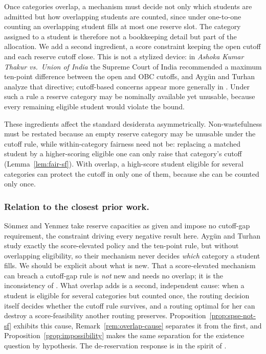 \documentclass[a4paper,twoside]{article}
\theoremstyle{definition}
\begin{document}
Once categories overlap, a mechanism must decide not only which students are admitted but how overlapping students are counted, since under one-to-one counting an overlapping student fills at most one reserve slot. The category assigned to a student is therefore not a bookkeeping detail but part of the allocation. We add a second ingredient, a score constraint keeping the open cutoff and each reserve cutoff close. This is not a stylized device: in \emph{Ashoka Kumar Thakur vs.\ Union of India} the Supreme Court of India recommended a maximum ten-point difference between the open and OBC cutoffs, and Ayg\"un and Turhan \cite{AyTu23b} analyze that directive; cutoff-based concerns appear more generally in \cite{AyTu23a,ABB24a}. Under such a rule a reserve category may be nominally available yet unusable, because every remaining eligible student would violate the bound.

These ingredients affect the standard desiderata \cite{EHYY14a,KHIY17a,GKK+17a} asymmetrically. Non-wastefulness must be restated because an empty reserve category may be unusable under the cutoff rule, while within-category fairness need not be: replacing a matched student by a higher-scoring eligible one can only raise that category's cutoff (Lemma~\ref{lem:fair-sf}). With overlap, a high-score student eligible for several categories can protect the cutoff in only one of them, because she can be counted only once.

\subsubsection{Relation to the closest prior work.}
S\"onmez and Yenmez \cite{SoYe20a,SoYe22a} take reserve capacities as given and impose no cutoff-gap requirement, the constraint driving every negative result here. Ayg\"un and Turhan \cite{AyTu23b} study exactly the score-elevated policy and the ten-point rule, but without overlapping eligibility, so their mechanism never decides \emph{which} category a student fills. We should be explicit about what is new. That a score-elevated mechanism can breach a cutoff-gap rule is \emph{not} new and needs no overlap; it is the inconsistency of \cite{AyTu23b}. What overlap adds is a second, independent cause: when a student is eligible for several categories but counted once, the routing decision itself decides whether the cutoff rule survives, and a routing optimal for her can destroy a score-feasibility another routing preserves. Proposition~\ref{prop:spse-not-sf} exhibits this cause, Remark~\ref{rem:overlap-cause} separates it from the first, and Proposition~\ref{prop:impossibility} makes the same separation for the existence question by hypothesis. The de-reservation response is in the spirit of \cite{AyTu23a}.
\end{document}

